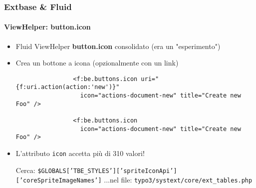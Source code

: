 \begin{frame}[fragile]
	\frametitle{Extbase \& Fluid}
	\framesubtitle{ViewHelper: button.icon}

	\lstset{
		basicstyle=\smaller\ttfamily
	}

	\begin{itemize}
		\item Fluid ViewHelper \textbf{button.icon} consolidato (era un "esperimento")
		\item Crea un bottone a icona (opzionalmente con un link)

			\begin{lstlisting}
				<f:be.buttons.icon uri="{f:uri.action(action:'new')}"
				  icon="actions-document-new" title="Create new Foo" />

				<f:be.buttons.icon
				  icon="actions-document-new" title="Create new Foo" />
			\end{lstlisting}

		\item L'attributo \texttt{icon} accetta più di 310 valori!\newline

			\smaller
				Cerca:\newline
				\texttt{\$GLOBALS['TBE\_STYLES']['spriteIconApi']['coreSpriteImageNames']}\newline
				...nel file:\newline
				\texttt{typo3/systext/core/ext\_tables.php}
			\normalsize

	\end{itemize}

\end{frame}


